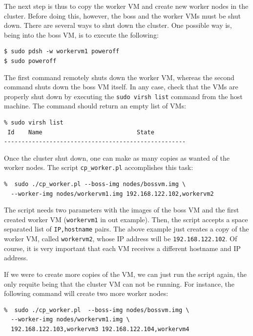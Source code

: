 \documentclass[a4]{article}
\begin{document}
The next step is thus to copy the worker VM and create new worker nodes in
the cluster. Before doing this, however, the boss and the worker VMs must be
shut down. There are several ways to shut down the cluster. One possible way
is, being into the boss VM, is to execute the following:

\begin{verbatim}
$ sudo pdsh -w workervm1 poweroff
$ sudo poweroff
\end{verbatim}

The first command remotely shuts down the worker VM, whereas the second
command shuts down the boss VM itself. In any case, check that the VMs are
properly shut down by executing the \texttt{sudo virsh list} command from
the host machine. The command should return an empty list of VMs:

\begin{verbatim}
% sudo virsh list
 Id    Name                           State
----------------------------------------------------
\end{verbatim}


Once the cluster shut down, one can make as many copies as wanted of the
worker nodes. The script \texttt{cp\_worker.pl} accomplishes this task:

\begin{verbatim}
%  sudo ./cp_worker.pl --boss-img nodes/bossvm.img \
  --worker-img nodes/workervm1.img 192.168.122.102,workervm2
\end{verbatim}

The script needs two parameters with the images of the boss VM and the first
created worker VM (\texttt{workervm1} in out example). Then, the script
accepts a space separated list of \texttt{IP,hostname} pairs. The above
example just creates a copy of the worker VM, called \texttt{workervm2},
whose IP address will be \texttt{192.168.122.102}. Of course, it is very
important that each VM receives a different hostname and IP address. 

If we were to create more copies of the VM, we can just run the script
again, the only requite being that the cluster VM can not be running. For
instance, the following command will create two more worker nodes:

\begin{verbatim}
%  sudo ./cp_worker.pl  --boss-img nodes/bossvm.img \
  --worker-img nodes/workervm1.img \
  192.168.122.103,workervm3 192.168.122.104,workervm4
\end{verbatim}
\end{document}
